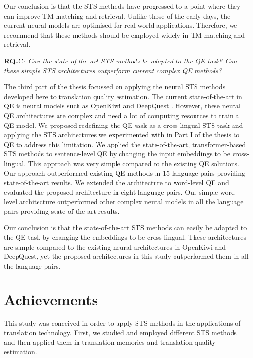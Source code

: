 Our conclusion is that the STS methods have progressed to a point where they can improve TM matching and retrieval. Unlike those of the early days, the current neural models are optimised for real-world applications. Therefore, we recommend that these methods should be employed widely in TM matching and retrieval.

\textbf{RQ-C}: \textit{Can the state-of-the-art STS methods be adapted to the QE task? Can these simple STS architectures outperform current complex QE methods?}

The third part of the thesis focussed on applying the neural STS methods developed here to translation quality estimation. The current state-of-the-art in QE is neural models such as OpenKiwi \autocite{kepler-etal-2019-openkiwi} and DeepQuest \autocite{ive-etal-2018-deepquest}. However, these neural QE architectures are complex and need a lot of computing resources to train a QE model. We proposed redefining the QE task as a cross-lingual STS task and applying the STS architectures we experimented with in Part I of the thesis to QE to address this limitation. We applied the state-of-the-art, transformer-based STS methods to sentence-level QE by changing the input embeddings to be cross-lingual. This approach was very simple compared to the existing QE solutions. Our approach outperformed existing QE methods in 15 language pairs providing state-of-the-art results. We extended the architecture to word-level QE and evaluated the proposed architecture in eight language pairs. Our simple word-level architecture outperformed other complex neural models in all the language pairs providing state-of-the-art results. 

Our conclusion is that the state-of-the-art STS methods can easily be adapted to the QE task by changing the embeddings to be cross-lingual. These architectures are simple compared to the existing neural architectures in OpenKiwi and DeepQuest, yet the proposed architectures in this study outperformed them in all the language pairs. 

\section{Achievements}
\label{sec:achievements}
This study was conceived in order to apply STS methods in the applications of translation technology. First, we studied and employed different STS methods and then applied them in translation memories and translation quality estimation.

